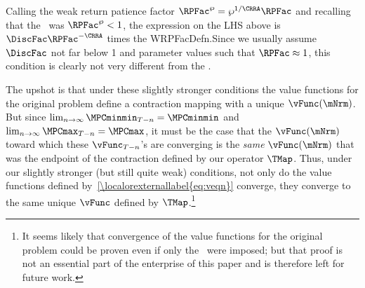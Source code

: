 \documentclass[\econtexRoot/BufferStockTheory]{subfiles}
\begin{document}
Calling the weak return patience factor $\RPFac^{\wp}=\wp^{1/\CRRA}\RPFac$ and recalling that the \WRIC~was $\RPFac^{\wp}<1$, the expression on the LHS above is $\DiscFac \RPFac^{-\CRRA}$ times the WRPFacDefn.\@ Since we usually assume $\DiscFac$ not far below 1 and parameter values such that $\RPFac \approx 1$, this condition is clearly not very different from the \WRIC.\@

The upshot is that under these slightly stronger conditions the value functions for the original problem define a contraction mapping with a unique $\vFunc(\mNrm)$.  But since $\lim_{n \rightarrow \infty} \MPCminmin_{T-n} = \MPCminmin$ and $\lim_{n \rightarrow \infty} \MPCmax_{T-n} = \MPCmax$, it must be the case that the $\vFunc(\mNrm)$ toward which these $\vFunc_{T-n}$'s are converging is the \textit{same} $\vFunc(\mNrm)$ that was the endpoint of the contraction defined by our operator $\TMap$.  Thus, under our slightly stronger (but still quite weak) conditions, not only do the value functions defined by~\eqref{\localorexternallabel{eq:veqn}} converge, they converge to the same unique $\vFunc$ defined by $\TMap$.\footnote{It seems likely that convergence of the value functions for the original problem could be proven even if only the \WRIC~were imposed; but that proof is not an essential part of the enterprise of this paper and is therefore left for future work.}

\onlyinsubfile{\pagebreak}
\end{document}
